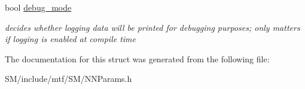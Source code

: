 \begin{DoxyCompactItemize}
\item 
\hypertarget{structmtf_1_1NNParams_ad6af60aebcee6712c57027b20c2bd4d3}{bool \hyperlink{structmtf_1_1NNParams_ad6af60aebcee6712c57027b20c2bd4d3}{debug\-\_\-mode}}\label{structmtf_1_1NNParams_ad6af60aebcee6712c57027b20c2bd4d3}

\begin{DoxyCompactList}\small\item\em decides whether logging data will be printed for debugging purposes; only matters if logging is enabled at compile time \end{DoxyCompactList}\end{DoxyCompactItemize}


The documentation for this struct was generated from the following file\-:\begin{DoxyCompactItemize}
\item 
S\-M/include/mtf/\-S\-M/N\-N\-Params.\-h\end{DoxyCompactItemize}
